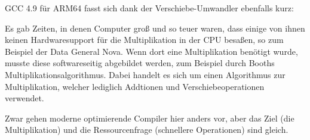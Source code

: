 








GCC 4.9 für ARM64 fasst sich dank der Verschiebe-Umwandler ebenfalls kurz:




Es gab Zeiten, in denen Computer groß und so teuer waren, dass einige von ihnen
keinen Hardwaresupport für die Multiplikation in der \ac{CPU} besaßen, so zum
Beispiel der Data General Nova. 
Wenn dort eine Multiplikation benötigt wurde, musste diese softwareseitig
abgebildet werden, zum Beispiel durch Booths Multiplikationsalgorithmus. 
Dabei handelt es sich um einen Algorithmus zur Multiplikation, welcher lediglich
Addtionen und Verschiebeoperationen verwendet. 

Zwar gehen moderne optimierende Compiler hier anders vor, aber das Ziel (die
Multiplikation) und die Ressourcenfrage (schnellere Operationen) sind gleich.

